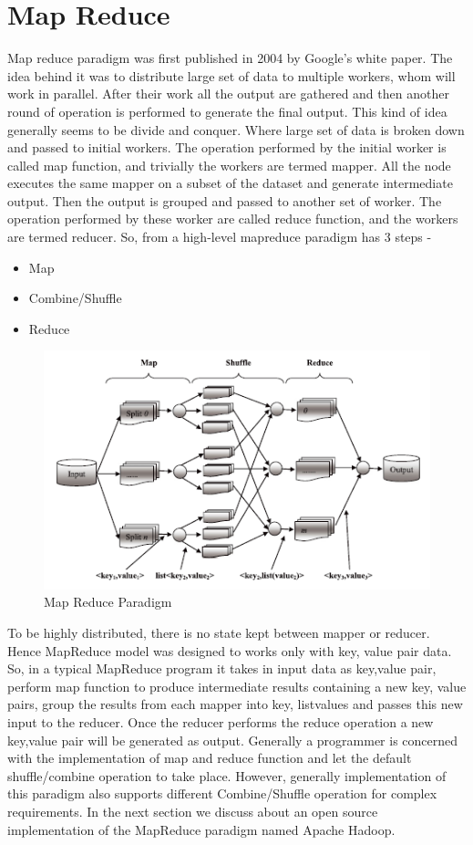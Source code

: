 \documentclass{article}
\begin{document}
\section{Map Reduce}
Map reduce paradigm was first published in 2004 by Google’s white paper. The idea behind it was to distribute large set of data to multiple workers, whom will work in parallel. After their work all the output are gathered and then another round of operation is performed to generate the final output. This kind of idea generally seems to be divide and conquer. Where large set of data is broken down and passed to initial workers. The operation performed by the initial worker is called map function, and trivially the workers are termed mapper. All the node executes the same mapper on a subset of the dataset and generate intermediate output. Then the output is grouped and passed to another set of worker. The operation performed by these worker are called reduce function, and the workers are termed reducer. So, from a high-level mapreduce paradigm has 3 steps -
\begin{itemize}
\item Map
\item Combine/Shuffle
\item Reduce
\end{itemize}
\begin{figure}[h]
	\centering
	\includegraphics[width=\textwidth]{mr-hadoop-overview}
	\caption{Map Reduce Paradigm}
	\label{fig:mrp}
\end{figure}
To be highly distributed, there is no state kept between mapper or reducer. Hence MapReduce model was designed to works only with {key, value} pair data. So, in a typical MapReduce program it takes in input data as {key,value} pair, perform map function to produce intermediate results containing a new {key, value} pairs, group the results from each mapper into {key, list{values}} and passes this new input to the reducer. Once the reducer performs the reduce operation a new {key,value} pair will be generated as output. Generally a programmer is concerned with the implementation of map and reduce function and let the default shuffle/combine operation to take place. However, generally implementation of this paradigm also supports different Combine/Shuffle operation for complex requirements.
In the next section we discuss about an open source implementation of the MapReduce paradigm named Apache Hadoop.
\end{document}
